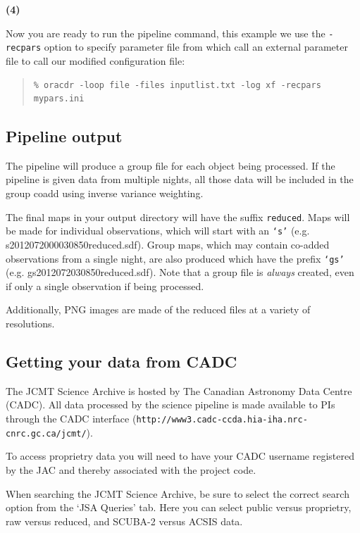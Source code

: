 \documentclass[twoside,11pt]{article}
\newcommand{\xlabel}[1]{}
\renewcommand{\_}{\texttt{\symbol{95}}}
\newenvironment{myquote}{\begin{quote}\begin{small}}{\end{small}\end{quote}}
\newcommand{\param}[1]{\texttt{#1}}
\begin{document}
\begin{minipage}[t]{0.05\linewidth}
\textbf{(4)}
\end{minipage}
\begin{minipage}[t]{0.95\linewidth}
Now you are ready to run the pipeline command, this example we use the \texttt{-recpars} option to specify parameter file from which call an external parameter file to call our modified configuration file:
 \begin{myquote}
\begin{verbatim}
% oracdr -loop file -files inputlist.txt -log xf -recpars mypars.ini
 \end{verbatim}
\end{myquote}
\end{minipage}

\subsection{\xlabel{pl_output}Pipeline output}
The pipeline will produce a  group file for each object being processed. If the pipeline is given data from multiple nights, all those data will be included in the group coadd using inverse variance weighting. 

The final maps in your output directory will have the suffix \param{\_reduced}. Maps will be made for  individual observations, which  will start with an \param{`s'} (e.g. s20120720\_00030\_850\_reduced.sdf). Group maps, which may contain co-added observations from a single night, are also produced which have the prefix \param{`gs'} (e.g. gs20120720\_30\_850\_reduced.sdf). Note that a group file is \emph{always} created, even if only a single observation if being processed.

Additionally, PNG images are made of the reduced files at a variety of resolutions.

\subsection{\xlabel{cadc}Getting your data from CADC}
The JCMT Science Archive is hosted by The Canadian Astronomy Data Centre  (CADC). All data processed by the science pipeline is made available to PIs through the CADC interface (\texttt{http://www3.cadc-ccda.hia-iha.nrc-cnrc.gc.ca/jcmt/}). 

To access proprietry data you will need to have your CADC username registered by the JAC and thereby associated with the project code. 

When searching the JCMT Science Archive, be sure to select the correct search option from the `JSA Queries' tab. Here you can select public versus proprietry, raw versus reduced, and SCUBA-2 versus ACSIS data.
\end{document}

